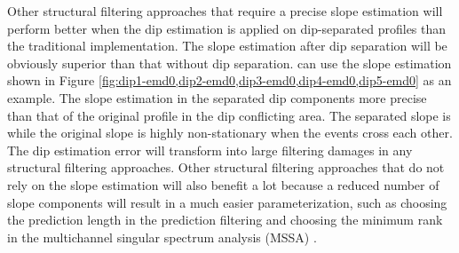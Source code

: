  Other structural filtering approaches that require a precise slope estimation will perform better when the dip estimation is applied on dip-separated profiles than the traditional implementation. The slope estimation after dip separation will be obviously superior than that without dip separation.  can use the slope estimation shown in Figure \ref{fig:dip1-emd0,dip2-emd0,dip3-emd0,dip4-emd0,dip5-emd0} as an example. The slope estimation in the separated dip components   more precise than that of the original profile in the dip conflicting area. The separated slope is  while the original slope is highly non-stationary when the events cross each other. The dip estimation error will transform into large filtering damages in any structural filtering approaches. Other structural filtering approaches that do not rely on the slope estimation will also benefit a lot because a reduced number of slope components will result in a much easier parameterization, such as choosing the prediction length in the prediction filtering \cite[]{yangkang2014} and choosing the minimum rank in the multichannel singular spectrum analysis (MSSA) \cite[]{mssa}.

